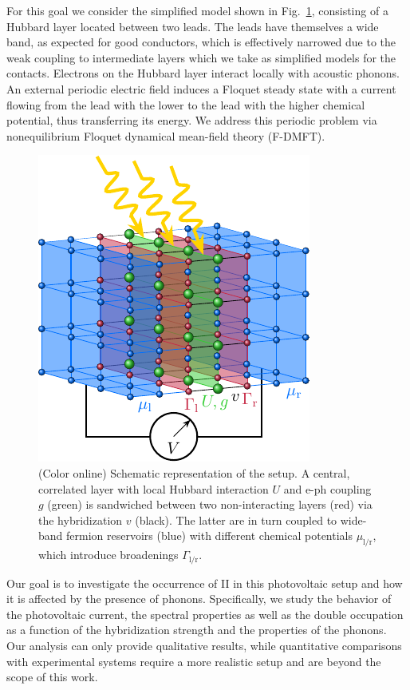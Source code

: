 \documentclass[aps,prb,groupedaddress,showpacs,twocolumn,superscriptaddress,10pt]{revtex4-2}
\begin{document}
For this goal we consider the simplified model shown in Fig.~\ref{fig:setup}, consisting of a Hubbard layer located between two leads. The leads have themselves a wide band, as expected for good conductors, which is effectively narrowed due to the weak coupling to intermediate layers which we take as simplified models for the contacts. Electrons on the Hubbard layer interact locally with acoustic phonons. An external periodic electric field induces a Floquet steady state with a current flowing from the lead with the lower to the lead with the higher chemical potential, thus transferring its energy. We address this periodic problem via nonequilibrium Floquet dynamical mean-field theory (F-DMFT).            
        
\begin{figure}[b] 
\includegraphics[width=0.75\linewidth]{Fig1.pdf}
\caption{(Color online) Schematic representation of the setup. A central, correlated layer with local Hubbard interaction $U$ and e-ph coupling $g$ (green) is sandwiched between two non-interacting layers (red) via the hybridization $v$ (black). The latter are in turn coupled to wide-band fermion reservoirs (blue) with different chemical potentials $\mu_{\text{l}/\text{r}}$, which introduce broadenings $\Gamma_{\text{l}/\text{r}}$.}
\label{fig:setup}
\end{figure}      
    
Our goal is to investigate the occurrence of II in this photovoltaic setup and how it is affected by the presence of phonons. Specifically, we study the behavior of the photovoltaic current, the spectral properties as well as the double occupation as a function of the hybridization strength and the properties of the phonons. Our analysis can only provide qualitative results, while quantitative comparisons with experimental systems require a more realistic setup and are beyond the scope of this work.
 
\end{document}

